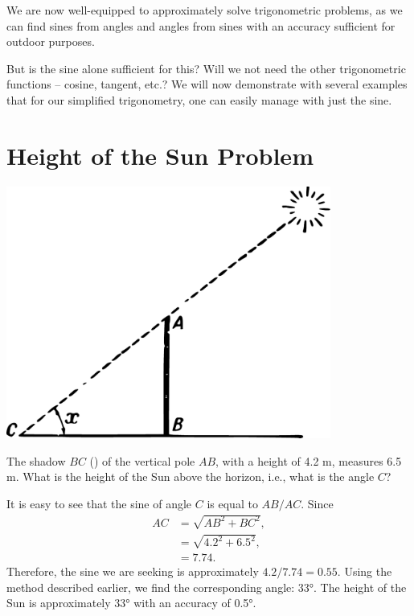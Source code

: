We are now well-equipped to approximately solve trigonometric problems, as we can find sines from angles and angles from sines with an accuracy sufficient for outdoor purposes.

But is the sine alone sufficient for this? Will we not need the other trigonometric functions -- cosine, tangent, etc.? We will now demonstrate with several examples that for our simplified trigonometry, one can easily manage with just the sine.

\section{Height of the Sun Problem}

\begin{marginfigure}%
\centering
\includegraphics[width=0.8\textwidth]{figures/ch-05/fig-092.pdf}
\end{marginfigure}

\ques The shadow $BC$ () of the vertical pole $AB$, with a height of 4.2 m, measures 6.5 m. What is the height of the Sun above the horizon, i.e., what is the angle $C$?


\ans It is easy to see that the sine of angle $C$ is equal to $AB/AC$. Since 
\begin{align*}%
AC & = \sqrt{AB^{2} + BC^{2}},\\
& = \sqrt{4.2^{2} + 6.5^{2}},\\ 
& = 7.74. 
\end{align*}
Therefore, the sine we are seeking is approximately $4.2/7.74 = 0.55$. Using the method described earlier, we find the corresponding angle: \ang{33}. The height of the Sun is approximately \ang{33} with an accuracy of \ang{0.5}.

